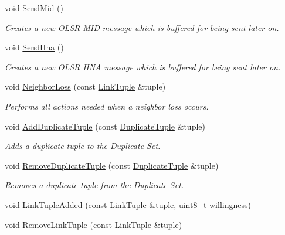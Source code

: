 \begin{DoxyCompactItemize}
void \hyperlink{classns3_1_1olsr_1_1RoutingProtocol_a6da315bbcafcdda3dc11acfea3b33d28}{Send\+Mid} ()
\begin{DoxyCompactList}\small\item\em Creates a new O\+L\+SR M\+ID message which is buffered for being sent later on. \end{DoxyCompactList}\item 
void \hyperlink{classns3_1_1olsr_1_1RoutingProtocol_a02fe3cc6e62962d002818651fc6988df}{Send\+Hna} ()
\begin{DoxyCompactList}\small\item\em Creates a new O\+L\+SR H\+NA message which is buffered for being sent later on. \end{DoxyCompactList}\item 
void \hyperlink{classns3_1_1olsr_1_1RoutingProtocol_afe342f9ee1d563e0691e12143f47233d}{Neighbor\+Loss} (const \hyperlink{structns3_1_1olsr_1_1LinkTuple}{Link\+Tuple} \&tuple)
\begin{DoxyCompactList}\small\item\em Performs all actions needed when a neighbor loss occurs. \end{DoxyCompactList}\item 
void \hyperlink{classns3_1_1olsr_1_1RoutingProtocol_ad863ed4e771bfe7ee021892ddacd2691}{Add\+Duplicate\+Tuple} (const \hyperlink{structns3_1_1olsr_1_1DuplicateTuple}{Duplicate\+Tuple} \&tuple)
\begin{DoxyCompactList}\small\item\em Adds a duplicate tuple to the Duplicate Set. \end{DoxyCompactList}\item 
void \hyperlink{classns3_1_1olsr_1_1RoutingProtocol_a72a3220cc44a4fadc7156bfc2603e547}{Remove\+Duplicate\+Tuple} (const \hyperlink{structns3_1_1olsr_1_1DuplicateTuple}{Duplicate\+Tuple} \&tuple)
\begin{DoxyCompactList}\small\item\em Removes a duplicate tuple from the Duplicate Set. \end{DoxyCompactList}\item 
void \hyperlink{classns3_1_1olsr_1_1RoutingProtocol_a49feb372260a7d855e02c789e584d5db}{Link\+Tuple\+Added} (const \hyperlink{structns3_1_1olsr_1_1LinkTuple}{Link\+Tuple} \&tuple, uint8\+\_\+t willingness)
\item 
void \hyperlink{classns3_1_1olsr_1_1RoutingProtocol_a1386148ca4a591a3409b54008b7ecae0}{Remove\+Link\+Tuple} (const \hyperlink{structns3_1_1olsr_1_1LinkTuple}{Link\+Tuple} \&tuple)

\end{DoxyCompactItemize}
